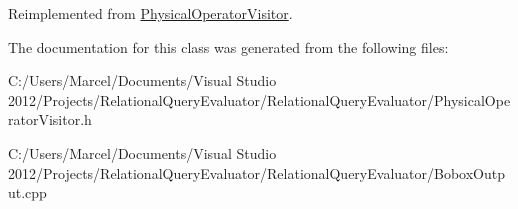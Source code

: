 Reimplemented from \hyperlink{class_physical_operator_visitor_adbb3e6618904bc7e6d0b6aa3958132e9}{Physical\+Operator\+Visitor}.



The documentation for this class was generated from the following files\+:\begin{DoxyCompactItemize}
\item 
C\+:/\+Users/\+Marcel/\+Documents/\+Visual Studio 2012/\+Projects/\+Relational\+Query\+Evaluator/\+Relational\+Query\+Evaluator/Physical\+Operator\+Visitor.\+h\item 
C\+:/\+Users/\+Marcel/\+Documents/\+Visual Studio 2012/\+Projects/\+Relational\+Query\+Evaluator/\+Relational\+Query\+Evaluator/Bobox\+Output.\+cpp\end{DoxyCompactItemize}
